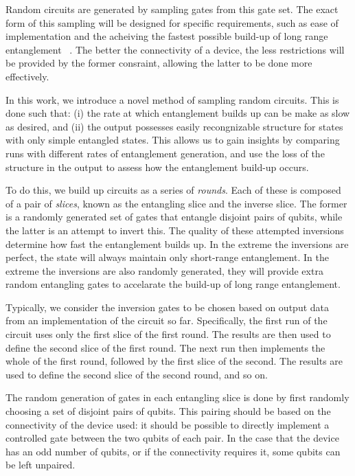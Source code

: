 \documentclass[aps,prl,twocolumn,showpacs,preprintnumbers]{revtex4-1}
\begin{document}
Random circuits are generated by sampling gates from this gate set. The exact form of this sampling will be designed for specific requirements, such as ease of implementation and the acheiving the fastest possible build-up of long range entanglement ~\cite{boixo:18}. The better the connectivity of a device, the less restrictions will be provided by the former consraint, allowing the latter to be done more effectively.

In this work, we introduce a novel method of sampling random circuits. This is done such that: (i) the rate at which entanglement builds up can be make as slow as desired, and (ii) the output possesses easily recongnizable structure for states with only simple entangled states. This allows us to gain insights by comparing runs with different rates of entanglement generation, and use the loss of the structure in the output to assess how the entanglement build-up occurs.

To do this, we build up circuits as a series of \textit{rounds}. Each of these is composed of a pair of \textit{slices}, known as the entangling slice and the inverse slice. The former is a randomly generated set of gates that entangle disjoint pairs of qubits, while the latter is an attempt to invert this. The quality of these attempted inversions determine how fast the entanglement builds up. In the extreme the inversions are perfect, the state will always maintain only short-range entanglement. In the extreme the inversions are also randomly generated, they will provide extra random entangling gates to accelarate the build-up of long range entanglement.

Typically, we consider the inversion gates to be chosen based on output data from an implementation of the circuit so far. Specifically, the first run of the circuit uses only the first slice of the first round. The results are then used to define the second slice of the first round. The next run then implements the whole of the first round, followed by the first slice of the second. The results are used to define the second slice of the second round, and so on.

The random generation of gates in each entangling slice is done by first randomly choosing a set of disjoint pairs of qubits. This pairing should be based on the connectivity of the device used: it should be possible to directly implement a controlled gate between the two qubits of each pair. In the case that the device has an odd number of qubits, or if the connectivity requires it, some qubits can be left unpaired.
\end{document}
